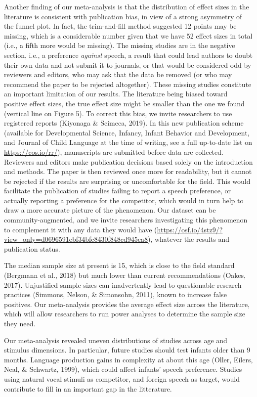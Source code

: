 \documentclass[man]{apa6}
\begin{document}
Another finding of our meta-analysis is that the distribution of effect
sizes in the literature is consistent with publication bias, in view of
a strong asymmetry of the funnel plot. In fact, the trim-and-fill method
suggested 12 points may be missing, which is a considerable number given
that we have 52 effect sizes in total (i.e., a fifth more would be
missing). The missing studies are in the negative section, i.e., a
preference \emph{against} speech, a result that could lead authors to
doubt their own data and not submit it to journals, or that would be
considered odd by reviewers and editors, who may ask that the data be
removed (or who may recommend the paper to be rejected altogether).
These missing studies constitute an important limitation of our results.
The literature being biased toward positive effect sizes, the true
effect size might be smaller than the one we found (vertical line on
Figure 5). To correct this bias, we invite researchers to use registered
reports (Kiyonaga \& Scimeca, 2019). In this new publication scheme
(available for Developmental Science, Infancy, Infant Behavior and
Development, and Journal of Child Language at the time of writing, see a
full up-to-date list on \url{https://cos.io/rr/}), manuscripts are
submitted before data are collected. Reviewers and editors make
publication decisions based solely on the introduction and methods. The
paper is then reviewed once more for readability, but it cannot be
rejected if the results are surprising or uncomfortable for the field.
This would facilitate the publication of studies failing to report a
speech preference, or actually reporting a preference for the
competitor, which would in turn help to draw a more accurate picture of
the phenomenon. Our dataset can be community-augmented, and we invite
researchers investigating this phenomenon to complement it with any data
they would have
(\url{https://osf.io/4stz9/?view_only=d0696591ebf34bfc8430f848cd945ca8}),
whatever the results and publication status.

The median sample size at present is 15, which is close to the field
standard (Bergmann et al., 2018) but much lower than current
recommendations (Oakes, 2017). Unjustified sample sizes can
inadvertently lead to questionable research practices (Simmons, Nelson,
\& Simonsohn, 2011), known to increase false positives. Our
meta-analysis provides the average effect size across the literature,
which will allow researchers to run power analyses to determine the
sample size they need.

Our meta-analysis revealed uneven distributions of studies across age
and stimulus dimensions. In particular, future studies should test
infants older than 9 months. Language production gains in complexity at
about this age (Oller, Eilers, Neal, \& Schwartz, 1999), which could
affect infants' speech preference. Studies using natural vocal stimuli
as competitor, and foreign speech as target, would contribute to fill in
an important gap in the litterature.
\end{document}
